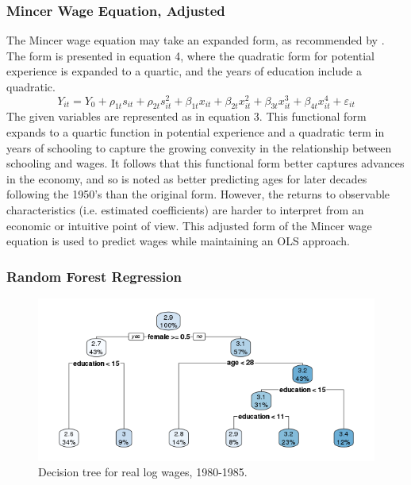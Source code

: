 \documentclass[notitlepage,12pt]{article}
\begin{document}
\subsubsection{Mincer Wage Equation, Adjusted}
The Mincer wage equation may take an expanded form, as recommended by \cite{lemieux2006mincer}.  The form is presented in equation 4, where the quadratic form for potential experience is expanded to a quartic, and the years of education include a quadratic.  
\begin{equation}
Y_{it}  = Y_0 + \rho_{1t} s_{it} + \rho_{2t} s_{it}^2 + \beta_{1t} x_{it} + \beta_{2t} x_{it}^2 + \beta_{3t} x_{it}^3 + \beta_{4t} x_{it}^4 + \varepsilon_{it}
\end{equation}
The given variables are represented as in equation 3.  This functional form  expands to a quartic function in potential experience and a quadratic term in years of schooling to capture the growing convexity in the relationship between schooling and wages.  It follows that this functional form better captures advances in the economy, and so is noted as better predicting ages for later decades following the 1950's than the original form.  However, the returns to observable characteristics (i.e. estimated coefficients) are harder to interpret from an economic or intuitive point of view.  This adjusted form of the Mincer wage equation is used to predict wages while maintaining an OLS approach.

\subsubsection{Random Forest Regression}
\begin{figure}[H]
  \centering
  \caption{Decision tree for real log wages, 1980-1985.}
  \includegraphics[width=\textwidth]{Rpat1980_1985.png}
\end{figure}
\end{document}
